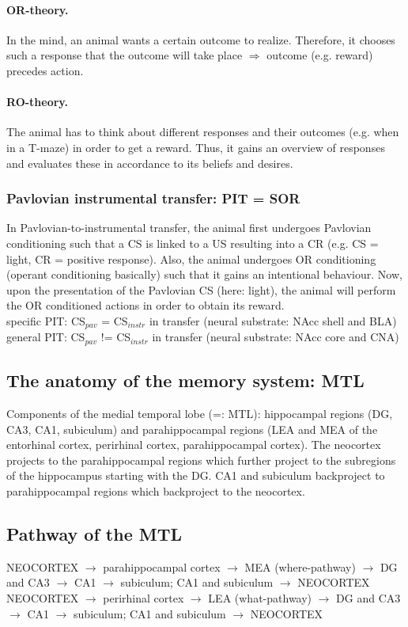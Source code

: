 \documentclass[twosided, a4paper, pt11]{article}
\begin{document}
	\paragraph{OR-theory.} In the mind, an animal wants a certain outcome to realize. Therefore, it chooses such a response that the outcome will take place $\Rightarrow$ outcome (e.g. reward) precedes action.
	
	\paragraph{RO-theory.} The animal has to think about different responses and their outcomes (e.g. when in a T-maze) in order to get a reward. Thus, it gains an overview of responses and evaluates these in accordance to its beliefs and desires.
	
	\subsubsection{Pavlovian instrumental transfer: PIT = SOR}
	In Pavlovian-to-instrumental transfer, the animal first undergoes Pavlovian conditioning such that a CS is linked to a US resulting into a CR (e.g. CS = light, CR = positive response). Also, the animal undergoes OR conditioning (operant conditioning basically) such that it gains an intentional behaviour. Now, upon the presentation of the Pavlovian CS (here: light), the animal will perform the OR conditioned actions in order to obtain its reward.\\
	specific PIT: CS$_{pav}$ = CS$_{instr}$ in transfer (neural substrate: NAcc shell and BLA)\\
	general PIT: CS$_{pav}$ != CS$_{instr}$ in transfer (neural substrate: NAcc core and CNA)\\
	
	\subsection{The anatomy of the memory system: MTL}
	Components of the medial temporal lobe (=: MTL): hippocampal regions (DG, CA3, CA1, subiculum) and parahippocampal regions (LEA and MEA of the entorhinal cortex, perirhinal cortex, parahippocampal cortex). The neocortex projects to the parahippocampal regions which further project to the subregions of the hippocampus starting with the DG. CA1 and subiculum backproject to parahippocampal regions which backproject to the neocortex.
	
	\subsection{Pathway of the MTL}
	NEOCORTEX $\rightarrow$ parahippocampal cortex $\rightarrow$ MEA (where-pathway) $\rightarrow$ DG and CA3 $\rightarrow$ CA1 $\rightarrow$ subiculum; CA1 and subiculum $\rightarrow$ NEOCORTEX\\
	NEOCORTEX $\rightarrow$ perirhinal cortex $\rightarrow$ LEA (what-pathway) $\rightarrow$ DG and CA3 $\rightarrow$ CA1 $\rightarrow$ subiculum; CA1 and subiculum $\rightarrow$ NEOCORTEX\newline
	
\end{document}
